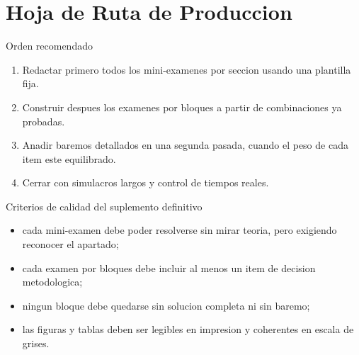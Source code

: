 \chapter{Hoja de Ruta de Produccion}

\begin{planningbox}{Orden recomendado}
\begin{enumerate}
  \item Redactar primero todos los mini-examenes por seccion usando una plantilla fija.
  \item Construir despues los examenes por bloques a partir de combinaciones ya probadas.
  \item Anadir baremos detallados en una segunda pasada, cuando el peso de cada item este
  equilibrado.
  \item Cerrar con simulacros largos y control de tiempos reales.
\end{enumerate}
\end{planningbox}

\begin{databox}{Criterios de calidad del suplemento definitivo}
\begin{itemize}
  \item cada mini-examen debe poder resolverse sin mirar teoria, pero exigiendo reconocer el
  apartado;
  \item cada examen por bloques debe incluir al menos un item de decision metodologica;
  \item ningun bloque debe quedarse sin solucion completa ni sin baremo;
  \item las figuras y tablas deben ser legibles en impresion y coherentes en escala de grises.
\end{itemize}
\end{databox}
